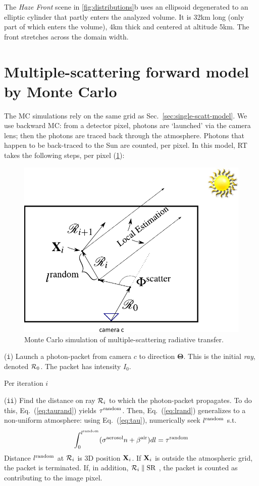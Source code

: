 \documentclass[10pt,letterpaper]{article}
\newcommand{\yoavcomment}[1]{}
\renewcommand{\yoavcomment}[1]{#1} %
\begin{document}
The {\em Haze Front} scene in \cref{fig:distributions}b uses an
ellipsoid degenerated to an elliptic cylinder that partly enters the
analyzed volume. It is 32km long (only part of which enters the
volume), 4km thick and centered at altitude 5km. The front stretches
across the domain width.

\section{Multiple-scattering forward model by Monte Carlo}
\label{sec:monte-carlo-simul}


The MC simulations rely on the same grid as
Sec.~\ref{sec:single-scatt-model}. We use backward MC: from a detector
pixel, photons are `launched' via the camera lens; then the photons
are traced back through the atmosphere. Photons that happen to be
back-traced to the Sun are counted, per pixel. In this model, RT takes
the following steps, per pixel (\cref{fig:mcgrid}):
\begin{figure}
  \centering
  \yoavcomment{\includegraphics[width=0.5\linewidth]{images/mcgrid.pdf}}
  \caption{\small Monte Carlo simulation of multiple-scattering
    radiative transfer.}
  \label{fig:mcgrid}
\end{figure}

\noindent ({\tt i}) Launch a photon-packet from camera $c$ to
direction ${\bm{\Theta}}$. This is the initial {\em ray}, denoted
${\cal R}_0$. The packet has intensity $I_0$.

\noindent Per iteration $i$

\noindent ({\tt ii}) Find the distance on ray ${\cal R}_{i}$ to which
the photon-packet propagates. To do this, Eq.~(\ref{eq:taurand})
yields $\tau^{\rm random}$. Then, Eq.~(\ref{eq:lrand}) generalizes to
a non-uniform atmosphere: using Eq.~(\ref{eq:tau}), numerically seek
$l^{\rm random}$ s.t.
\begin{align}
  \int_0^{l^{\rm random}}(\sigma^{\rm aerosol} n +\beta^{\rm air}) dl
  = \tau^{\rm random}
  \label{eq:MCextinct}
\end{align}
Distance $l^{\rm random}$ at ${\cal R}_{i}$ is 3D position ${\bf
  X}_{i}$.  If ${\bf X}_{i}$ is outside the atmospheric grid, the
packet is terminated. If, in addition, ${\cal R}_{i}\parallel {\rm
  SR}$ , the packet is counted as contributing to the image pixel.
\end{document}
